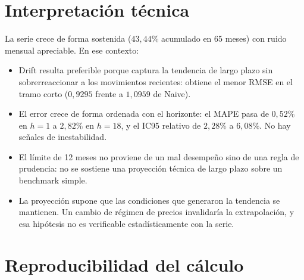 \documentclass[11pt,letterpaper]{article}
\begin{document}
\section{Interpretación técnica}

La serie crece de forma sostenida (\(43{,}44\%\) acumulado en 65 meses) con
ruido mensual apreciable. En ese contexto:

\begin{itemize}
  \item Drift resulta preferible porque captura la tendencia de largo plazo sin sobrerreaccionar a los movimientos recientes: obtiene el menor RMSE en el tramo corto (\(0{,}9295\) frente a \(1{,}0959\) de Naive).
  \item El error crece de forma ordenada con el horizonte: el MAPE pasa de \(0{,}52\%\) en \(h=1\) a \(2{,}82\%\) en \(h=18\), y el IC95 relativo de \(2{,}28\%\) a \(6{,}08\%\). No hay señales de inestabilidad.
  \item El límite de 12 meses no proviene de un mal desempeño sino de una regla de prudencia: no se sostiene una proyección técnica de largo plazo sobre un benchmark simple.
  \item La proyección supone que las condiciones que generaron la tendencia se mantienen. Un cambio de régimen de precios invalidaría la extrapolación, y esa hipótesis no es verificable estadísticamente con la serie.
\end{itemize}

\section{Reproducibilidad del cálculo}
\end{document}
